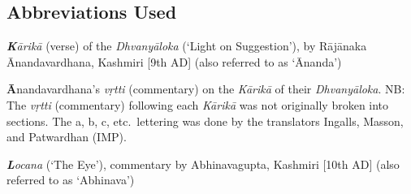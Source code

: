 \documentclass[10pt]{article}
\begin{document}
\subsection{Abbreviations Used}

\begin{description}
	\setlength{\itemsep}{-0.25em}

	\item[K] \textit{\textbf{K}ārikā} (verse) of the \textit{Dhvanyāloka} (`Light on Suggestion'),
	    by Rājānaka \\ Ānandavardhana, Kashmiri [9th AD] (also referred to as `Ānanda')%

	\item[A] \textbf{Ā}nandavardhana's \textit{vṛtti} (commentary) on the \textit{Kārikā} of their \textit{Dhvanyāloka}. 
		NB: The \textit{vṛtti} (commentary) following each \textit{Kārikā} was not originally broken into sections. 
		The a, b, c, etc.\ lettering was done by the translators Ingalls, Masson, and Patwardhan (IMP).

	\item[L] \textit{\textbf{L}ocana} (`The Eye'), commentary by Abhinavagupta, Kashmiri [10th AD]  (also referred to as `Abhinava')
\end{description}
\end{document}
